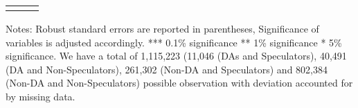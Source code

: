 \begin{table}[!htbp]
{\begin{threeparttable}
\begin{tabular}{@{\extracolsep{5pt}}lD{.}{.}{-3} D{.}{.}{-3} }
\bottomrule \\[-1.8ex] 


\end{tabular} 

\begin{tablenotes}
  \LARGE
      Notes: Robust standard errors are reported in parentheses, Significance of variables is adjusted accordingly. *** 0.1\% significance ** 1\% significance * 5\% significance. We have a total of 1,115,223 (11,046 (DAs and Speculators), 40,491 (DA and Non-Speculators), 261,302 (Non-DA and Speculators) and 802,384 (Non-DA and Non-Speculators) possible observation with deviation accounted for by missing data.
\end{tablenotes}    



\end{threeparttable}
}
\end{table} 